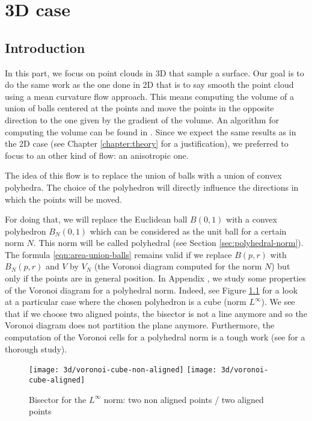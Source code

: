 \chapter{3D case}
\label{chapter:3d}

\section{Introduction}

In this part, we focus on point clouds in 3D that sample a surface. Our goal is
to do the same work as the one done in 2D that is to say smooth the point cloud
using a mean curvature flow approach. This means computing the volume of a union
of balls centered at the points and move the points in the opposite direction to
the one given by the gradient of the volume. An algorithm for computing the
volume can be found in \cite{cazals2011computing}. Since we expect the same
results as in the 2D case (see Chapter \ref{chapter:theory} for a
justification), we preferred to focus to an other kind of flow: an anisotropic
one.

The idea of this flow is to replace the union of balls with a union of convex
polyhedra. The choice of the polyhedron will directly influence the directions
in which the points will be moved.

For doing that, we will replace the Euclidean ball $ B(0, 1) $ with a convex
polyhedron $ B_N(0, 1) $ which can be considered as the unit ball for a certain
norm $ N $. This norm will be called polyhedral (see Section
\ref{sec:polyhedral-norm}). The formula \ref{eqn:area-union-balls} remains valid
if we replace $ B(p, r) $ with $ B_N(p, r) $ and $ V $ by $ V_N $ (the Voronoi
diagram computed for the norm $ N $) but only if the points are in general
position. In Appendix , we study
some properties of the Voronoi diagram for a polyhedral norm. Indeed, see Figure
\ref{fig:3d-voronoi-cube} for a look at a particular case where the chosen
polyhedron is a cube (norm $ L^\infty $). We see that if we choose two aligned
points, the bisector is not a line anymore and so the Voronoi diagram does not
partition the plane anymore. Furthermore, the computation of the Voronoi cells
for a polyhedral norm is a tough work (see \cite{ma2000bisectors} for a thorough
study).

\begin{figure}[h]
    \centering

    \texttt{[image: 3d/voronoi-cube-non-aligned]}
    \hspace{2cm}
    \texttt{[image: 3d/voronoi-cube-aligned]}
    \caption{Bisector for the $ L^\infty $ norm: two non aligned points / two
        aligned points}
    \label{fig:3d-voronoi-cube}
\end{figure}

